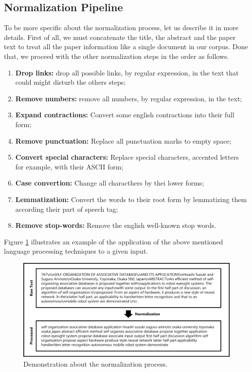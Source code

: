 \subsection{Normalization Pipeline}

To be more specific about the normalization process, let us describe it in more details. First of all, we must concatenate the title, the abstract and the paper text to treat all the paper information like a single document in our corpus. Done that, we proceed with the other normalization steps in the order as follows.

\begin{enumerate}
	\item \textbf{Drop links:} drop all possible links, by regular expression, in the text that could might disturb the others steps;
	\item \textbf{Remove numbers:} remove all numbers, by regular expression, in the text;
	\item \textbf{Expand contractions:} Convert some english contractions into their full form;
	\item \textbf{Remove punctuation:} Replace all punctuation marks to empty space;
	\item \textbf{Convert special characters:} Replace special characters, accented letters for example, with their ASCII form;
	\item \textbf{Case convertion:} Change all characthers by thei lower forms;
	\item \textbf{Lemmatization:} Convert the words to their root form by lemmatizing them according their part of speech tag;
	\item \textbf{Remove stop-words:} Remove the english well-known stop words.
\end{enumerate}

Figure \ref{fig:normalized-text} illustrates an example of the application of the above mentioned language processing techniques to a given input.

\begin{figure}[h!]
	\centering
	\includegraphics[width=\linewidth]{01.Chapters/04.Materials/normalization-process}
	\caption{Demonstration about the normalization process.}
	\label{fig:normalized-text}
\end{figure}

